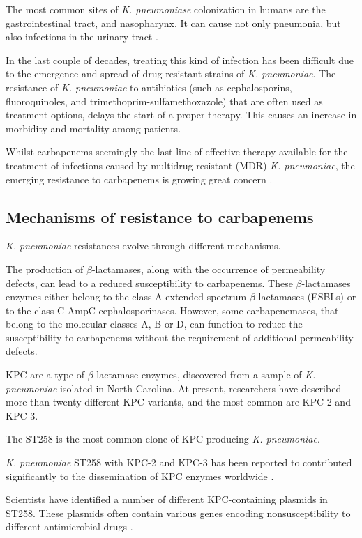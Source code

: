 \documentclass[11pt]{report}
\begin{document}
The most common sites of \emph{K. pneumoniase} colonization in humans are the gastrointestinal tract, and nasopharynx.
It can cause not only pneumonia, but also infections in the urinary tract \cite{Pitout2015, podschun1998klebsiella}.

In the last couple of decades, treating this kind of infection has been difficult due to the emergence and spread of drug-resistant strains of \emph{K. pneumoniae}.
The resistance of \emph{K. pneumoniae} to antibiotics (such as cephalosporins, fluoroquinoles, and trimethoprim-sulfamethoxazole) that are often used as treatment options, delays the start of a proper therapy.
This causes an increase in morbidity and mortality among patients.

Whilst carbapenems seemingly the last line of effective therapy available for the treatment of infections caused by multidrug-resistant (MDR) \emph{K. pneumoniae}, the emerging resistance to carbapenems is growing great concern
 \cite{Pitout2015}.

\subsection{Mechanisms of resistance to carbapenems} 

\emph{K. pneumoniae} resistances evolve through different mechanisms.

The production of $\beta$-lactamases, along with the occurrence of permeability defects, can lead to a reduced susceptibility to carbapenems.
These $\beta$-lactamases enzymes either belong to the class A extended-spectrum $\beta$-lactamases (ESBLs) or to the class C AmpC cephalosporinases.
However, some carbapenemases, that belong to the molecular classes A, B or D, can function to reduce the susceptibility to carbapenems without the requirement of additional permeability defects.

KPC are a type of $\beta$-lactamase enzymes, discovered from a sample of \emph{K. pneumoniae} isolated in North Carolina.
At present, researchers have described more than twenty different KPC variants, and the most common are KPC-2 and KPC-3.

The ST258 is the most common clone of KPC-producing \emph{K. pneumoniae}.

\emph{K. pneumoniae} ST258 with KPC-2 and KPC-3 has been reported to contributed significantly to the dissemination of KPC enzymes worldwide \cite{Pitout2015}.

Scientists have identified a number of different KPC-containing plasmids in ST258.
These plasmids often contain various genes encoding nonsusceptibility to different antimicrobial drugs \cite{Pitout2015}.
\end{document}
